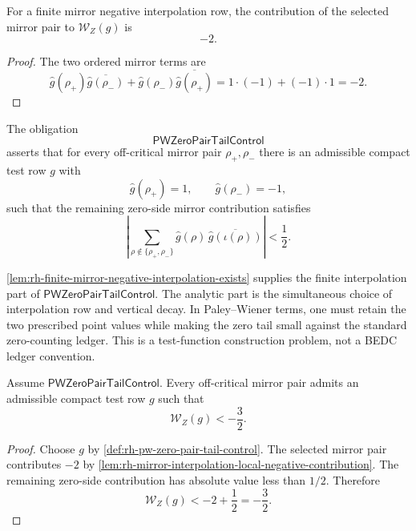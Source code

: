 \begin{lemma}
\label{lem:rh-mirror-interpolation-local-negative-contribution}
For a finite mirror negative interpolation row, the contribution of the
selected mirror pair to $\mathcal W_Z(g)$ is
$$
-2.
$$
\end{lemma}

\begin{proof}
The two ordered mirror terms are
$$
\widehat g(\rho_+)\overline{\widehat g(\rho_-)}
+
\widehat g(\rho_-)\overline{\widehat g(\rho_+)}
=
1\cdot(-1)+(-1)\cdot1
=
-2.
$$
\end{proof}

\begin{definition}[PWZeroPairTailControl]
\label{def:rh-pw-zero-pair-tail-control}
The obligation
$$
\mathsf{PWZeroPairTailControl}
$$
asserts that for every off-critical mirror pair
$\rho_+,\rho_-$ there is an admissible compact test row $g$ with
$$
\widehat g(\rho_+)=1,
\qquad
\widehat g(\rho_-)=-1,
$$
such that the remaining zero-side mirror contribution satisfies
$$
\left|
\sum_{\rho\notin\{\rho_+,\rho_-\}}
\widehat g(\rho)\,
\overline{\widehat g(\iota(\rho))}
\right|
<
\frac12.
$$
\end{definition}

\begin{principle}
\label{prin:rh-tail-control-analytic-content}
\autoref{lem:rh-finite-mirror-negative-interpolation-exists} supplies the
finite interpolation part of
$\mathsf{PWZeroPairTailControl}$.  The analytic part is the simultaneous
choice of interpolation row and vertical decay.  In Paley--Wiener
terms, one must retain the two prescribed point values while making the
zero tail small against the standard zero-counting ledger.  This is a
test-function construction problem, not a BEDC ledger convention.
\end{principle}

\begin{theorem}
\label{thm:rh-tail-controlled-mirror-pair-negative-zero-side-readout}
Assume $\mathsf{PWZeroPairTailControl}$.  Every off-critical mirror pair
admits an admissible compact test row $g$ such that
$$
\mathcal W_Z(g)<-\frac32.
$$
\end{theorem}

\begin{proof}
Choose $g$ by \autoref{def:rh-pw-zero-pair-tail-control}.  The selected
mirror pair contributes $-2$ by
\autoref{lem:rh-mirror-interpolation-local-negative-contribution}.  The
remaining zero-side contribution has absolute value less than $1/2$.
Therefore
$$
\mathcal W_Z(g)<-2+\frac12=-\frac32.
$$
\end{proof}

